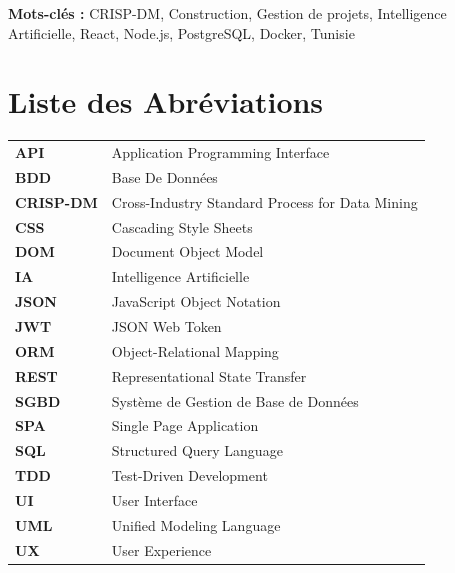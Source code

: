 \documentclass[12pt, a4paper]{report}
\begin{document}
\textbf{Mots-clés :} CRISP-DM, Construction, Gestion de projets, Intelligence Artificielle, React, Node.js, PostgreSQL, Docker, Tunisie

\tableofcontents

\listoffigures
{}

\listoftables
{}

\chapter*{Liste des Abréviations}

\begin{longtable}{ll}
\textbf{API} & Application Programming Interface \\
\textbf{BDD} & Base De Données \\
\textbf{CRISP-DM} & Cross-Industry Standard Process for Data Mining \\
\textbf{CSS} & Cascading Style Sheets \\
\textbf{DOM} & Document Object Model \\
\textbf{IA} & Intelligence Artificielle \\
\textbf{JSON} & JavaScript Object Notation \\
\textbf{JWT} & JSON Web Token \\
\textbf{ORM} & Object-Relational Mapping \\
\textbf{REST} & Representational State Transfer \\
\textbf{SGBD} & Système de Gestion de Base de Données \\
\textbf{SPA} & Single Page Application \\
\textbf{SQL} & Structured Query Language \\
\textbf{TDD} & Test-Driven Development \\
\textbf{UI} & User Interface \\
\textbf{UML} & Unified Modeling Language \\
\textbf{UX} & User Experience \\
\end{longtable}
\end{document}
